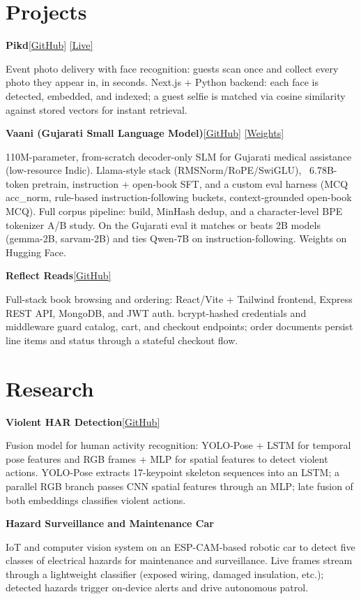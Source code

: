 \documentclass[10pt,letterpaper]{article}
\newcommand{\resumeProjectHeading}[2]{%
  \textbf{#1}\hfill\small #2\par\vspace{0pt}
}
\begin{document}
\section{Projects}
\resumeProjectHeading{Pikd}{\href{https://github.com/pratham-commits/pikd}{[GitHub]} \enspace \href{https://pikd-photos.vercel.app/}{[Live]}}
\footnotesize
Event photo delivery with face recognition: guests scan once and collect every photo they appear in, in seconds. Next.js + Python backend: each face is detected, embedded, and indexed; a guest selfie is matched via cosine similarity against stored vectors for instant retrieval.

\resumeProjectHeading{Vaani (Gujarati Small Language Model)}{\href{https://github.com/pratham-commits/vaani}{[GitHub]} \enspace \href{https://huggingface.co/pratham-commits/vaani-gujarati-slm}{[Weights]}}
\footnotesize
110M-parameter, from-scratch decoder-only SLM for Gujarati medical assistance (low-resource Indic). Llama-style stack (RMSNorm/RoPE/SwiGLU), ~6.78B-token pretrain, instruction + open-book SFT, and a custom eval harness (MCQ acc\_norm, rule-based instruction-following buckets, context-grounded open-book MCQ). Full corpus pipeline: build, MinHash dedup, and a character-level BPE tokenizer A/B study. On the Gujarati eval it matches or beats 2B models (gemma-2B, sarvam-2B) and ties Qwen-7B on instruction-following. Weights on Hugging Face.

\resumeProjectHeading{Reflect Reads}{\href{https://github.com/pratham-commits/reflect_reads}{[GitHub]}}
\footnotesize
Full-stack book browsing and ordering: React/Vite + Tailwind frontend, Express REST API, MongoDB, and JWT auth. bcrypt-hashed credentials and middleware guard catalog, cart, and checkout endpoints; order documents persist line items and status through a stateful checkout flow.

\section{Research}
\resumeProjectHeading{Violent HAR Detection}{\href{https://github.com/pratham-commits/violence-har-detection}{[GitHub]}}
\footnotesize
Fusion model for human activity recognition: YOLO-Pose + LSTM for temporal pose features and RGB frames + MLP for spatial features to detect violent actions. YOLO-Pose extracts 17-keypoint skeleton sequences into an LSTM; a parallel RGB branch passes CNN spatial features through an MLP; late fusion of both embeddings classifies violent actions.

\resumeProjectHeading{Hazard Surveillance and Maintenance Car}{}
\footnotesize
IoT and computer vision system on an ESP-CAM-based robotic car to detect five classes of electrical hazards for maintenance and surveillance. Live frames stream through a lightweight classifier (exposed wiring, damaged insulation, etc.); detected hazards trigger on-device alerts and drive autonomous patrol.
\end{document}
